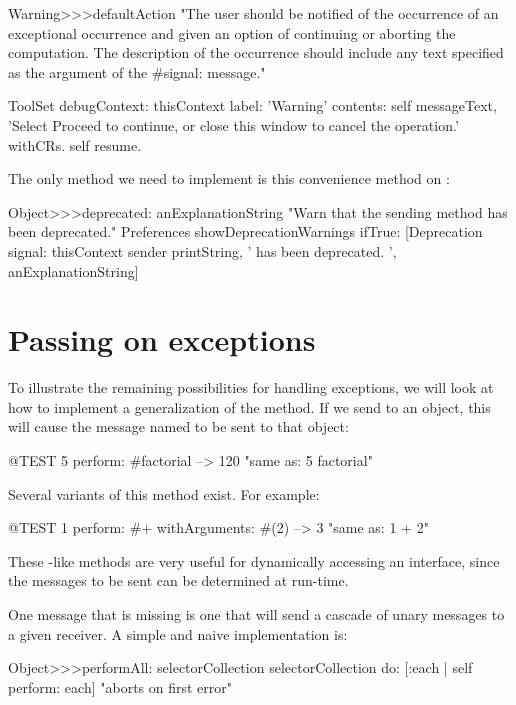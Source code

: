 \documentclass[a4paper,10pt,twoside]{book}
\begin{document}
\begin{code}{}
Warning>>>defaultAction 
	"The user should be notified of the occurrence of an exceptional occurrence
	and given an option of continuing or aborting the computation. The description
	of the occurrence should include any text specified as the argument of the
	#signal: message." 

	ToolSet 
		debugContext: thisContext 
		label: 'Warning' 
		contents: self messageText, 'Select Proceed to continue, or close this window to cancel the operation.' withCRs. 
		self resume. 
\end{code}

The only method we need to implement is this convenience method on :
\begin{code}{}
Object>>>deprecated: anExplanationString
	"Warn that the sending method has been deprecated."
	Preferences showDeprecationWarnings ifTrue:
		[Deprecation signal: thisContext sender printString, ' has been deprecated. ', anExplanationString]
\end{code}

\section{Passing on exceptions}

To illustrate the remaining possibilities for handling exceptions, we will look at how to implement a generalization of the  method.
If we send  to an object, this will cause the message named  to be sent  to that object:
\begin{code}{@TEST}
5 perform: #factorial --> 120    "same as: 5 factorial"
\end{code}

Several variants of this method exist. For example:
\begin{code}{@TEST}
1 perform: #+ withArguments: #(2) --> 3    "same as: 1 + 2"
\end{code}
These -like methods are very useful for dynamically accessing an interface, since the messages to be sent can be determined at run-time.

One message that is missing is one that will send a cascade of unary messages to a given receiver. A simple and naive implementation is:
\begin{code}{}
Object>>>performAll: selectorCollection
	selectorCollection do: [:each | self perform: each]    "aborts on first error"
\end{code}
\end{document}
